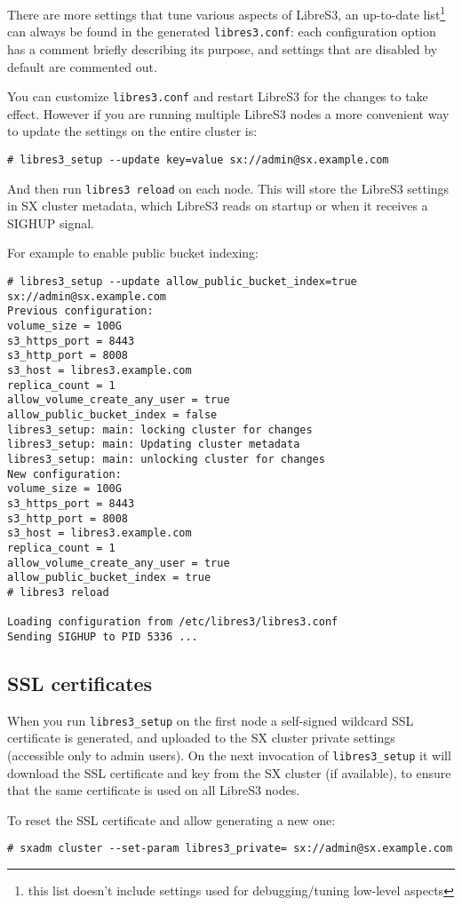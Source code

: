 There are more settings that tune various aspects of LibreS3, an up-to-date
list\footnote{this list doesn't include settings used for debugging/tuning
  low-level aspects} can always be found in the generated \verb|libres3.conf|: each configuration option has
a comment briefly describing its purpose, and settings that are disabled by
default are commented out.

You can customize \verb|libres3.conf| and restart LibreS3 for the changes to take effect.
However if you are running multiple LibreS3 nodes a more convenient way to
update the settings on the entire cluster is:
\begin{lstlisting}
# libres3_setup --update key=value sx://admin@sx.example.com
\end{lstlisting}
And then run \verb|libres3 reload| on each node.
This will store the LibreS3 settings in SX cluster metadata, which LibreS3 reads
on startup or when it receives a SIGHUP signal.

For example to enable public bucket indexing:
\begin{lstlisting}
# libres3_setup --update allow_public_bucket_index=true sx://admin@sx.example.com
Previous configuration:
volume_size = 100G
s3_https_port = 8443
s3_http_port = 8008
s3_host = libres3.example.com
replica_count = 1
allow_volume_create_any_user = true
allow_public_bucket_index = false
libres3_setup: main: locking cluster for changes
libres3_setup: main: Updating cluster metadata
libres3_setup: main: unlocking cluster for changes
New configuration:
volume_size = 100G
s3_https_port = 8443
s3_http_port = 8008
s3_host = libres3.example.com
replica_count = 1
allow_volume_create_any_user = true
allow_public_bucket_index = true
# libres3 reload

Loading configuration from /etc/libres3/libres3.conf
Sending SIGHUP to PID 5336 ... 
\end{lstlisting}

\subsection{SSL certificates}

When you run \verb|libres3_setup| on the first node a self-signed wildcard SSL certificate is
generated, and uploaded to the SX cluster private settings (accessible only to
admin users).
On the next invocation of \verb|libres3_setup| it will download the SSL
certificate and key from the SX cluster (if available), to ensure that the same
certificate is used on all LibreS3 nodes.

To reset the SSL certificate and allow generating a new one:
\begin{lstlisting}
# sxadm cluster --set-param libres3_private= sx://admin@sx.example.com
\end{lstlisting}

